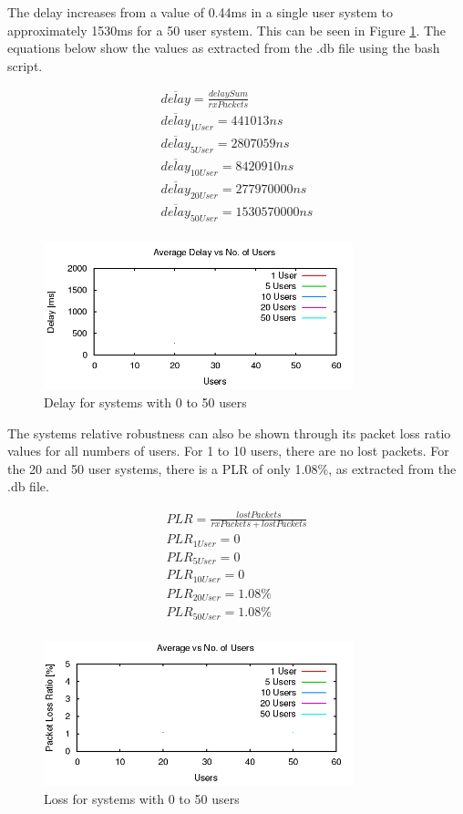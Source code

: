 The delay increases from a value of 0.44ms in a single user system to
approximately 1530ms for a 50 user system. This can be seen in Figure
\ref{fig:QCP2delay}. The equations below show the values as extracted from the
.db file using the bash script.

\begin{gather*}
	\overline{delay}=\frac{delaySum}{rxPackets} \\
	\overline{delay}_{1 User}=441013ns \\
	\overline{delay}_{5 User}=2807059ns \\
	\overline{delay}_{10 User}=8420910ns \\
	\overline{delay}_{20 User}=277970000ns \\
	\overline{delay}_{50 User}=1530570000ns \\
\end{gather*}

\begin{figure}[H]
	\centering
	\includegraphics[width=0.8\textwidth]{images/EE500/QC/P2/Images/wifi-delay}
	\caption{Delay for systems with 0 to 50 users}
	\label{fig:QCP2delay}
\end{figure}

The systems relative robustness can also be shown through its packet loss ratio
values for all numbers of users. For 1 to 10 users, there are no lost packets.
For the 20 and 50 user systems, there is a PLR of only 1.08\%, as extracted from
the .db file.

\begin{gather*}
	PLR=\frac{lostPackets}{rxPackets+lostPackets} \\
	PLR_{1 User}=0 \\
	PLR_{5 User}=0 \\
	PLR_{10 User}=0 \\
	PLR_{20 User}=1.08\% \\
	PLR_{50 User}=1.08\% \\
\end{gather*}

\begin{figure}[H]
	\centering
	\includegraphics[width=0.8\textwidth]{images/EE500/QC/P2/Images/wifi-loss}
	\caption{Loss for systems with 0 to 50 users}
	\label{fig:QCP2loss}
\end{figure}
